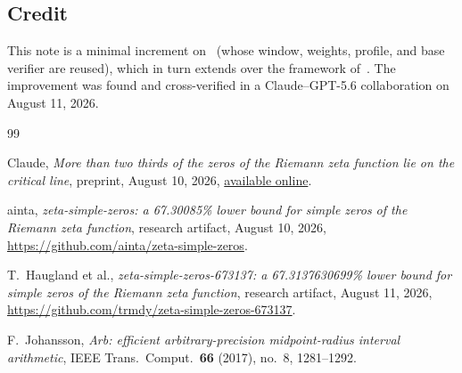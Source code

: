 \documentclass[11pt]{article}
\begin{document}
\subsection*{Credit}

This note is a minimal increment on~\cite{Trmdy26} (whose window, weights,
profile, and base verifier are reused), which in turn extends
\cite{Ainta26} over the framework of~\cite{Claude26}.  The improvement was
found and cross-verified in a Claude--GPT-5.6 collaboration on August 11,
2026.

\begin{thebibliography}{99}
\small

Claude,
\emph{More than two thirds of the zeros of the Riemann zeta function lie on
the critical line},
preprint, August 10, 2026,
\href{https://www-cdn.anthropic.com/564f962e60643842f5fcb4a17c9dbc8f608f1c37.pdf}{available online}.

ainta,
\emph{zeta-simple-zeros: a 67.30085\% lower bound for simple zeros of the
Riemann zeta function},
research artifact, August 10, 2026,
\url{https://github.com/ainta/zeta-simple-zeros}.

T.~Haugland et al.,
\emph{zeta-simple-zeros-673137: a 67.3137630699\% lower bound for simple
zeros of the Riemann zeta function},
research artifact, August 11, 2026,
\url{https://github.com/trmdy/zeta-simple-zeros-673137}.

F.~Johansson,
\emph{Arb: efficient arbitrary-precision midpoint-radius interval
arithmetic},
IEEE Trans.\ Comput.\ \textbf{66} (2017), no.~8, 1281--1292.

\end{thebibliography}
\end{document}
